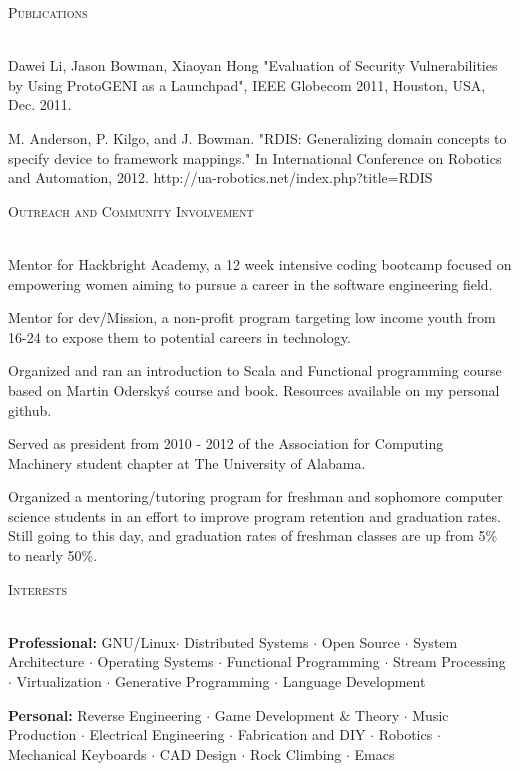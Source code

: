 \documentclass[10pt,letterpaper]{article}
\newcommand{\lineunder}{\vspace*{-8pt} \\ \hspace*{-18pt} \hrulefill \\}
\newcommand{\header}[1]{{\hspace*{-15pt}\vspace*{6pt} \textsc{#1}} \vspace*{-6pt} \lineunder}
\begin{document}
\header{Publications}
\vspace*{-5pt}
\begin{itemize*}
\item Dawei Li, Jason Bowman, Xiaoyan Hong "Evaluation of Security Vulnerabilities by Using ProtoGENI as a Launchpad", IEEE Globecom 2011, Houston, USA, Dec. 2011.
\item M. Anderson, P. Kilgo, and J. Bowman. "RDIS: Generalizing domain concepts to specify device to framework mappings." In International Conference on Robotics and Automation, 2012. http://ua-robotics.net/index.php?title=RDIS
\end{itemize*}

\vspace*{3pt}

\header{Outreach and Community Involvement}
\vspace*{-5pt}
\begin{itemize*}
\item Mentor for Hackbright Academy, a 12 week intensive coding bootcamp focused
  on empowering women aiming to pursue a career in the software engineering field.
\item Mentor for dev/Mission, a non-profit program targeting low income youth
  from 16-24 to expose them to potential careers in technology.
\item Organized and ran an introduction to Scala and Functional programming
  course based on Martin Odersky\'s course and book. Resources available on
  my personal github. 
\item Served as president from 2010 - 2012 of the Association for Computing
  Machinery student chapter at The University of Alabama.
\item Organized a mentoring/tutoring program for freshman and sophomore computer
  science students in an effort to improve program retention and graduation
  rates. Still going to this day, and graduation rates of freshman classes are
  up from 5\% to nearly 50\%.
\end{itemize*}

\vspace*{3pt}

\header{Interests}
\vspace*{-5pt}
\begin{itemize*}
\item \textbf{Professional:} GNU/Linux$\cdot$ Distributed Systems $\cdot$ Open Source $\cdot$
  System Architecture $\cdot$ Operating Systems $\cdot$ Functional Programming
  $\cdot$ Stream Processing $\cdot$ Virtualization $\cdot$
  Generative Programming $\cdot$ Language Development
\item \textbf{Personal:} Reverse Engineering $\cdot$ Game Development \& Theory $\cdot$ Music Production $\cdot$
  Electrical Engineering $\cdot$ Fabrication and DIY $\cdot$ Robotics $\cdot$ Mechanical
  Keyboards $\cdot$ CAD Design $\cdot$ Rock Climbing $\cdot$ Emacs 
\end{itemize*}
\vspace*{8pt}

	
\end{document}
